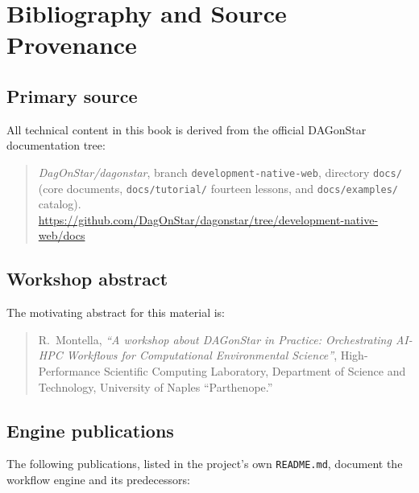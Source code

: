 \chapter*{Bibliography and Source Provenance}

\section*{Primary source}

All technical content in this book is derived from the official DAGonStar
documentation tree:

\begin{quote}
\textit{DagOnStar/dagonstar}, branch \texttt{development-native-web},
directory \texttt{docs/} (core documents, \texttt{docs/tutorial/} fourteen
lessons, and \texttt{docs/examples/} catalog).\\
\url{https://github.com/DagOnStar/dagonstar/tree/development-native-web/docs}
\end{quote}

\section*{Workshop abstract}

The motivating abstract for this material is:

\begin{quote}
R.~Montella, \emph{``A workshop about DAGonStar in Practice: Orchestrating
AI-HPC Workflows for Computational Environmental Science''}, High-Performance
Scientific Computing Laboratory, Department of Science and Technology,
University of Naples ``Parthenope.''
\end{quote}

\section*{Engine publications}

The following publications, listed in the project's own \texttt{README.md},
document the workflow engine and its predecessors:

